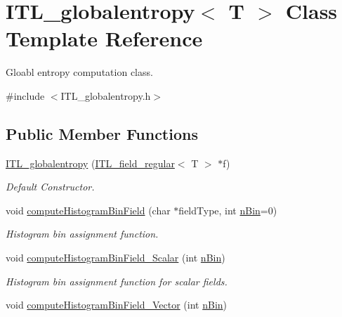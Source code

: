 \hypertarget{classITL__globalentropy}{
\section{ITL\_\-globalentropy$<$ T $>$ Class Template Reference}
\label{classITL__globalentropy}
}


Gloabl entropy computation class.  




{\ttfamily \#include $<$ITL\_\-globalentropy.h$>$}

\subsection*{Public Member Functions}
\begin{DoxyCompactItemize}
\item 
\hyperlink{classITL__globalentropy_af82eb0ffa8d7d33ec3e3c6af95322cf2}{ITL\_\-globalentropy} (\hyperlink{classITL__field__regular}{ITL\_\-field\_\-regular}$<$ T $>$ $\ast$f)
\begin{DoxyCompactList}\small\item\em Default Constructor. \item\end{DoxyCompactList}\item 
void \hyperlink{classITL__globalentropy_afe13cb031dbfa959c547ac1a0d849472}{computeHistogramBinField} (char $\ast$fieldType, int \hyperlink{MainIT__regvector_8cpp_a7f13753d4707f6bc8f71d8bdacedefb3}{nBin}=0)
\begin{DoxyCompactList}\small\item\em Histogram bin assignment function. \item\end{DoxyCompactList}\item 
void \hyperlink{classITL__globalentropy_aad50922e014e3b5929e9415c8ddef382}{computeHistogramBinField\_\-Scalar} (int \hyperlink{MainIT__regvector_8cpp_a7f13753d4707f6bc8f71d8bdacedefb3}{nBin})
\begin{DoxyCompactList}\small\item\em Histogram bin assignment function for scalar fields. \item\end{DoxyCompactList}\item 
void \hyperlink{classITL__globalentropy_a6929e8efe91de1d1d604897ac1d1cb0f}{computeHistogramBinField\_\-Vector} (int \hyperlink{MainIT__regvector_8cpp_a7f13753d4707f6bc8f71d8bdacedefb3}{nBin})

\end{DoxyCompactItemize}
